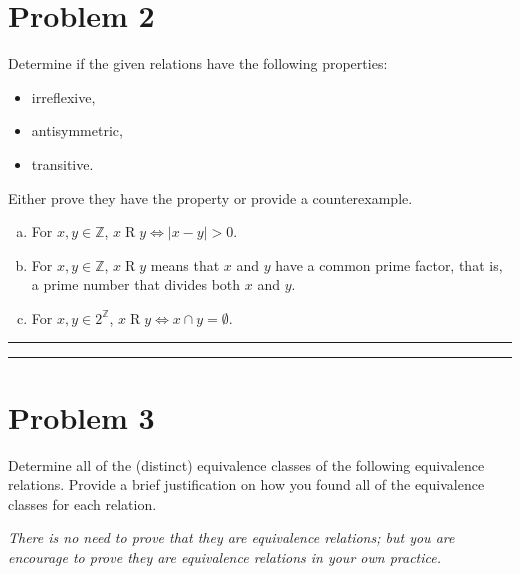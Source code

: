 \documentclass{article}
\theoremstyle{definition}
\newenvironment{solution}{\bigskip\hrule{\hfill}}{\bigskip\hrule{\hfill}} %
\begin{document}
\section*{Problem 2}
Determine if the given relations have the following properties:
\begin{itemize}
    \item irreflexive,
    \item antisymmetric,
    \item transitive.
\end{itemize}
Either prove they have the property or provide a counterexample.
\begin{enumerate}[a)] %
    \item For $x,y\in\mathbb{Z}$, $x\mathrel{R}y\Longleftrightarrow\left|x-y\right|>0$.
    \item For $x,y\in\mathbb{Z}$, $x\mathrel{R}y$ means that $x$ and $y$ have a common prime factor, that is, a prime number that divides both $x$ and $y$.
    \item For $x,y\in 2^{\mathbb{Z}}$, $x\mathrel{R}y\Longleftrightarrow x\cap y=\emptyset$.
\end{enumerate}
\begin{solution}


\end{solution}


\newpage


\section*{Problem 3}
Determine all of the (distinct) equivalence classes of the following equivalence relations. Provide a brief justification on how you found all of the equivalence classes for each relation. \medskip

\noindent\emph{There is no need to prove that they are equivalence relations; but you are encourage to prove they are equivalence relations in your own practice.}
\end{document}
